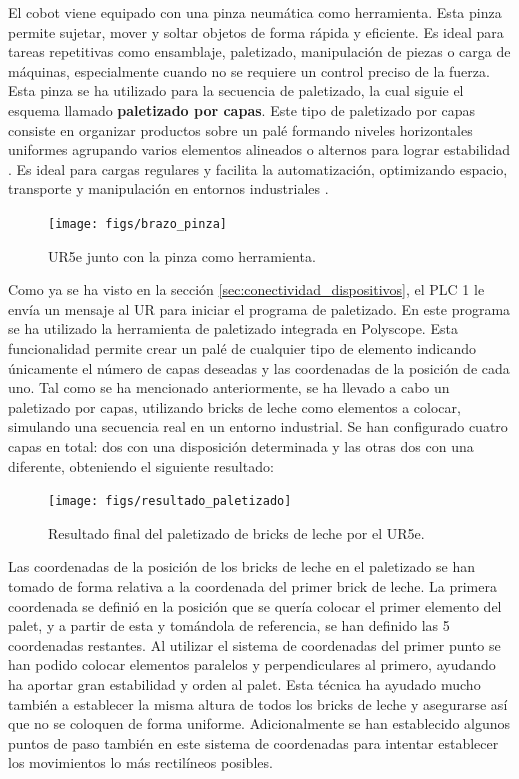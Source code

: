 El cobot viene equipado con una pinza neumática como herramienta. Esta pinza permite sujetar, mover y soltar objetos de forma rápida y eficiente. Es ideal para tareas repetitivas como ensamblaje, paletizado, manipulación de piezas o carga de máquinas, especialmente cuando no se requiere un control preciso de la fuerza. Esta pinza se ha utilizado para la secuencia de paletizado, la cual siguie el esquema llamado \textbf{paletizado por capas}. Este tipo de paletizado por capas consiste en organizar productos sobre un palé formando niveles horizontales uniformes agrupando varios elementos alineados o alternos para lograr estabilidad \cite{paletizado_capas}. Es ideal para cargas regulares y facilita la automatización, optimizando espacio, transporte y manipulación en entornos industriales \cite{paletizado_capas}. 

\begin{figure}[h!]
  \begin{center}
  	\texttt{[image: figs/brazo\_pinza]}
  \end{center}
  \caption{\centering UR5e junto con la pinza como herramienta.}
  \label{fig:brazo_pinza}
\end{figure}

Como ya se ha visto en la sección \ref{sec:conectividad_dispositivos}, el PLC 1 le envía un mensaje al UR para iniciar el programa de paletizado. En este programa se ha utilizado la herramienta de paletizado integrada en Polyscope. Esta funcionalidad permite crear un palé de cualquier tipo de elemento indicando únicamente el número de capas deseadas y las coordenadas de la posición de cada uno. Tal como se ha mencionado anteriormente, se ha llevado a cabo un paletizado por capas, utilizando bricks de leche como elementos a colocar, simulando una secuencia real en un entorno industrial. Se han configurado cuatro capas en total: dos con una disposición determinada y las otras dos con una diferente, obteniendo el siguiente resultado:

\begin{figure}[h!]
  \begin{center}
  	\texttt{[image: figs/resultado\_paletizado]}
  \end{center}
  \caption{\centering Resultado final del paletizado de bricks de leche por el UR5e.}
  \label{fig:resultado_paletizado}
\end{figure}

Las coordenadas de la posición de los bricks de leche en el paletizado se han tomado de forma relativa a la coordenada del primer brick de leche. La primera coordenada se definió en la posición que se quería colocar el primer elemento del palet, y a partir de esta y tomándola de referencia, se han definido las 5 coordenadas restantes. Al utilizar el sistema de coordenadas del primer punto se han podido colocar elementos paralelos y perpendiculares al primero, ayudando ha aportar gran estabilidad y orden al palet. Esta técnica ha ayudado mucho también a establecer la misma altura de todos los bricks de leche y asegurarse así que no se coloquen de forma uniforme. Adicionalmente se han establecido algunos puntos de paso también en este sistema de coordenadas para intentar establecer los movimientos lo más rectilíneos posibles. 

